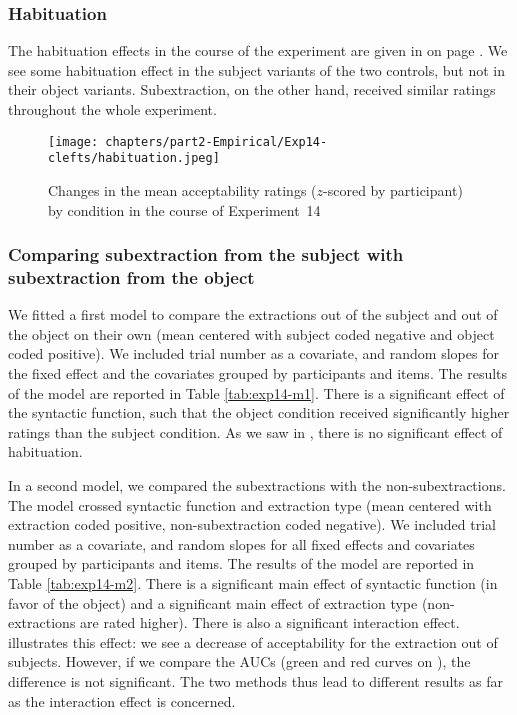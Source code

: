 \subsubsection{Habituation}\largerpage

The habituation effects in the course of the experiment are given in  on page \pageref{fig:exp14-habituation}. We see some habituation effect in the subject variants of the two controls, but not in their object variants. Subextraction, on the other hand, received similar ratings throughout the whole experiment.

\begin{figure}
    \centering
    \texttt{[image: chapters/part2-Empirical/Exp14-clefts/habituation.jpeg]}
    \caption{Changes in the mean acceptability ratings ($z$-scored by participant) by condition in the course of Experiment~14}
    \label{fig:exp14-habituation}
\end{figure}

\subsubsection{Comparing subextraction from the subject with subextraction from the object}

We fitted a first model to compare the extractions out of the subject and out of the object on their own (mean centered with subject coded negative and object coded positive). We included trial number as a covariate, and random slopes for the fixed effect and the covariates grouped by participants and items. The results of the model are reported in Table \ref{tab:exp14-m1}. 
There is a significant effect of the syntactic function, such that the object condition received significantly higher ratings than the subject condition. As we saw in , there is no significant effect of habituation.



In a second model, we compared the subextractions with the non-subextractions. The model crossed syntactic function and extraction type (mean centered with extraction coded positive, non-subextraction coded negative). We included trial number as a covariate, and random slopes for all fixed effects and covariates grouped by participants and items. The results of the model are reported in Table \ref{tab:exp14-m2}.
There is a significant main effect of syntactic function (in favor of the object) and a significant main effect of extraction type (non-extractions are rated higher). There is also a significant interaction effect. 
 illustrates this effect: we see a decrease of acceptability for the extraction out of subjects. However, if we compare the AUCs (green and red curves on ), the difference is not significant. The two methods thus lead to different results as far as the interaction effect is concerned. 

